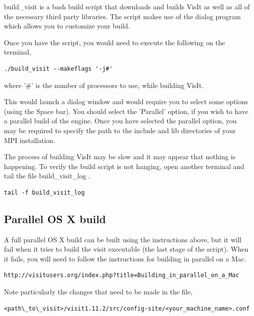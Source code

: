 \documentclass[12pt]{report}
\begin{document}
build\_visit is a bash build script that downloads and builds VisIt as well as all of the necessary third party libraries. The script makes use of the dialog program which allows you to customize your build.

Once you have the script, you would need to execute the following on the terminal,

\begin{Verbatim}[fontsize=\footnotesize]
./build_visit --makeflags '-j#'
\end{Verbatim}
	
\normalfont where '\#' is the number of processors to use, while building VisIt. 

This would launch a dialog window and would require you to select some options (using the Space bar). You should select the 'Parallel' option, if you wish to have a parallel build of the engine. Once you have selected the parallel option, you may be required to specify the path to the include and lib directories of your MPI installation. 

The process of building VisIt may be slow and it may appear that nothing is happening. To verify the build script is not hanging, open another terminal and tail the file build\_visit\_log	. 

\begin{Verbatim}[fontsize=\footnotesize]
tail -f build_visit_log
\end{Verbatim}

\normalfont  
\subsection{Parallel OS X build}
\label{sec:ParallelOSXBuild}

A full parallel OS X build can be built using the instructions above, but it will fail when it tries to build the visit executable (the last stage of the script). When it fails, you will need to follow the instructions for building in parallel on a Mac. 

\begin{Verbatim}[fontsize=\footnotesize]
http://visitusers.org/index.php?title=Building_in_parallel_on_a_Mac
\end{Verbatim}
  
Note particularly the changes that need to be made in the file, 

\begin{Verbatim}[fontsize=\footnotesize]
<path\_to\_visit>/visit1.11.2/src/config-site/<your_machine_name>.conf
\end{Verbatim}
\end{document}
